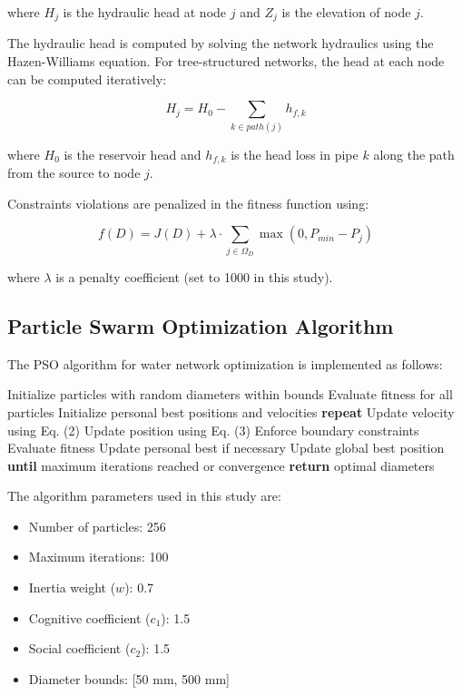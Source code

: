 \documentclass[conference]{IEEEtran}
\begin{document}
where $H_j$ is the hydraulic head at node $j$ and $Z_j$ is the elevation of node $j$.

The hydraulic head is computed by solving the network hydraulics using the Hazen-Williams equation. For tree-structured networks, the head at each node can be computed iteratively:

\begin{equation}
H_j = H_0 - \sum_{k \in path(j)} h_{f,k}
\end{equation}

where $H_0$ is the reservoir head and $h_{f,k}$ is the head loss in pipe $k$ along the path from the source to node $j$.

Constraints violations are penalized in the fitness function using:

\begin{equation}
f(D) = J(D) + \lambda \cdot \sum_{j \in \Omega_D} \max(0, P_{min} - P_j)
\end{equation}

where $\lambda$ is a penalty coefficient (set to 1000 in this study).

\subsection{Particle Swarm Optimization Algorithm}

The PSO algorithm for water network optimization is implemented as follows:

\begin{algorithm}
\caption{PSO for Water Network Optimization}
\begin{algorithmic}[1]
\State Initialize particles with random diameters within bounds
\State Evaluate fitness for all particles
\State Initialize personal best positions and velocities
\State \textbf{repeat}
\State Update velocity using Eq. (2)
\State Update position using Eq. (3)
\State Enforce boundary constraints
\State Evaluate fitness
\State Update personal best if necessary
\EndFor
\State Update global best position
\State \textbf{until} maximum iterations reached or convergence
\State \textbf{return} optimal diameters
\end{algorithmic}
\end{algorithm}

The algorithm parameters used in this study are:
\begin{itemize}
\item Number of particles: 256
\item Maximum iterations: 100
\item Inertia weight ($w$): 0.7
\item Cognitive coefficient ($c_1$): 1.5
\item Social coefficient ($c_2$): 1.5
\item Diameter bounds: [50 mm, 500 mm]
\end{itemize}
\end{document}

